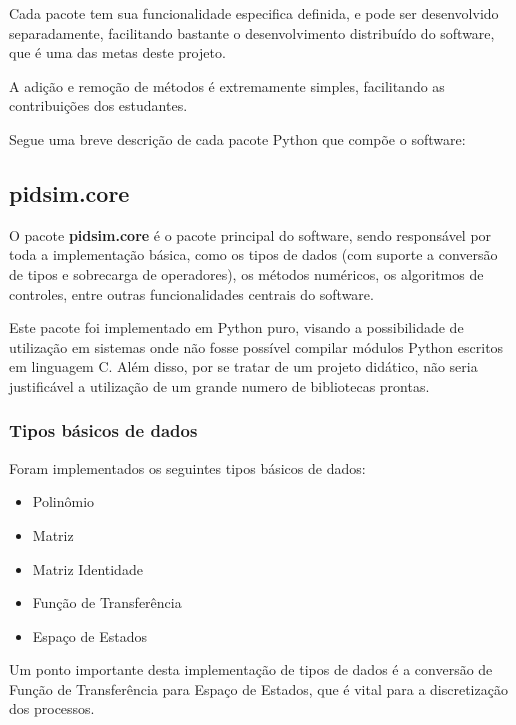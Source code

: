     Cada pacote tem sua funcionalidade especifica definida, e pode ser desenvolvido
    separadamente, facilitando bastante o desenvolvimento distribuído do software,
    que é uma das metas deste projeto.

    A adição e remoção de métodos é extremamente simples, facilitando as contribuições
    dos estudantes.

    Segue uma breve descrição de cada pacote Python que compõe o software:

    \subsection{pidsim.core}

        O pacote \textbf{pidsim.core} é o pacote principal do software, sendo responsável
        por toda a implementação básica, como os tipos de dados (com suporte a conversão
        de tipos e sobrecarga de operadores), os métodos numéricos, os algoritmos de controles,
        entre outras funcionalidades centrais do software.

        Este pacote foi implementado em Python puro, visando a possibilidade de utilização
        em sistemas onde não fosse possível compilar módulos Python escritos em linguagem C.
        Além disso, por se tratar de um projeto didático, não seria justificável a utilização
        de um grande numero de bibliotecas prontas.

        \subsubsection{Tipos básicos de dados}

            Foram implementados os seguintes tipos básicos de dados:
        
            \begin{itemize}
                \item Polinômio
                \item Matriz
                \item Matriz Identidade
                \item Função de Transferência
                \item Espaço de Estados
            \end{itemize}

            Um ponto importante desta implementação de tipos de dados é a conversão de Função
            de Transferência para Espaço de Estados, que é vital para a discretização dos
            processos.

